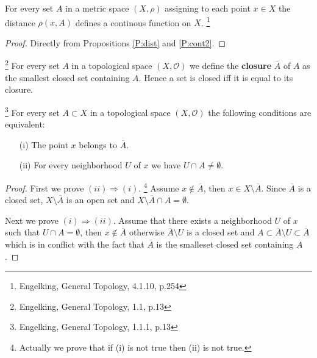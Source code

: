 \begin{theorem} \label{T:dist_cont}
For every set $A$ in a metric space $(X,\rho)$ assigning to each point $x\in X$
the distance $\rho(x,A)$ defines a continous function on $X$.
\footnote{Engelking, General Topology, 4.1.10, p.254}
\end{theorem}
\begin{proof}
Directly from Propositions \ref{P:dist} and \ref{P:cont2}.
\end{proof}


\begin{definition}
\footnote{Engelking, General Topology, 1.1, p.13}
For every set $A$ in a topological space $(X,\mathcal{O})$ we define the 
\textbf{closure} 
$\overline{A}$ of $A$ as the smallest closed set containing $A$. 
Hence a set is closed iff it is equal to its closure.
\end{definition}

\begin{proposition} \label{P:clos}
\footnote{Engelking, General Topology, 1.1.1, p.13}
For every set $A\subset X$ in a topological space $(X,\mathcal{O})$ the
following conditions are equivalent:
\begin{enumerate}
  \item[(i)] The point $x$ belongs to $\overline{A}$.
  \item[(ii)] For every neighborhood $U$ of $x$ we have $U\cap A\neq\emptyset$.
\end{enumerate}
\end{proposition}
\begin{proof}
First we prove $(ii)\Rightarrow (i)$.
\footnote{Actually we prove that if (i) is not true then (ii) is not true.}
Assume $x\notin\overline{A}$, then $x\in X\setminus \overline{A}$. Since $\overline{A}$ is a 
closed set, $X\setminus \overline{A}$ is an open set and 
$X\setminus \overline{A} \cap A=\emptyset$.

Next we prove $(i)\Rightarrow (ii)$. Assume that there exists a neighborhood $U$
of $x$ such that $U\cap A=\emptyset$, then $x\notin\overline{A}$ otherwise
$\overline{A}\setminus U$ is a closed set and 
$A\subset \overline{A}\setminus U \subset\overline{A}$ which is in conflict with the fact
that $\overline{A}$ is the smalleset closed set containing $A$.
\end{proof}


